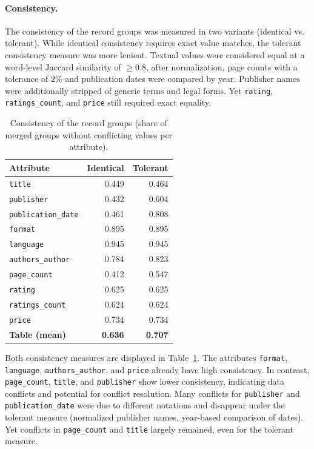 \documentclass[runningheads]{llncs}
\begin{document}
\paragraph{Consistency.}

The consistency of the record groups was measured in two variants (identical vs. tolerant). While identical consistency requires exact value matches, the tolerant consistency measure was more lenient. Textual values were considered equal at a word-level Jaccard similarity of $\geq 0.8$, after normalization, page counts with a tolerance of $2\%$ and publication dates were compared by year. Publisher names were additionally stripped of generic terms and legal forms. Yet \texttt{rating}, \texttt{ratings\_count}, and \texttt{price} still required exact equality.

\begin{table}[h]
\caption{Consistency of the record groups (share of merged groups without conflicting values per attribute).}
\label{tab:consistency}
\centering
\small
\setlength{\tabcolsep}{6pt}
\begin{tabular}{lrr}
\toprule
Attribute & Identical & Tolerant \\
\midrule
\texttt{title}            & 0.449 & 0.464 \\
\texttt{publisher}        & 0.432 & 0.604 \\
\texttt{publication\_date} & 0.461 & 0.808 \\
\texttt{format}           & 0.895 & 0.895 \\
\texttt{language}         & 0.945 & 0.945 \\
\texttt{authors\_author}   & 0.784 & 0.823 \\
\texttt{page\_count}       & 0.412 & 0.547 \\
\texttt{rating}           & 0.625 & 0.625 \\
\texttt{ratings\_count}    & 0.624 & 0.624 \\
\texttt{price}            & 0.734 & 0.734 \\
\midrule
\textbf{Table (mean)}     & \textbf{0.636} & \textbf{0.707} \\
\bottomrule
\end{tabular}
\end{table}

Both consistency measures are displayed in Table~\ref{tab:consistency}. The attributes \texttt{format}, \texttt{language}, \texttt{authors\_author}, and \texttt{price} already have high consistency. In contrast, \texttt{page\_count}, \texttt{title}, and \texttt{publisher} show lower consistency, indicating data conflicts and potential for conflict resolution. Many conflicts for \texttt{publisher} and \texttt{publication\_date} were due to different notations and disappear under the tolerant measure (normalized publisher names, year-based comparison of dates). Yet conflicts in \texttt{page\_count} and \texttt{title} largely remained, even for the tolerant measure.
\end{document}
